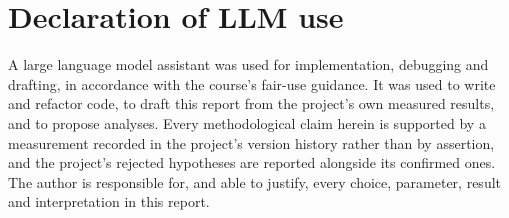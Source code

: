 \documentclass[11pt,a4paper]{article}
\begin{document}
\section*{Declaration of LLM use}

A large language model
assistant was used for implementation, debugging and drafting, in accordance with
the course's fair-use guidance. It was used to write and refactor code, to draft
this report from the project's own measured results, and to propose analyses.
Every methodological claim herein is supported by a measurement recorded in the
project's version history rather than by assertion, and the project's rejected
hypotheses are reported alongside its confirmed ones. The author is responsible
for, and able to justify, every choice, parameter, result and interpretation in
this report.



\end{document}
